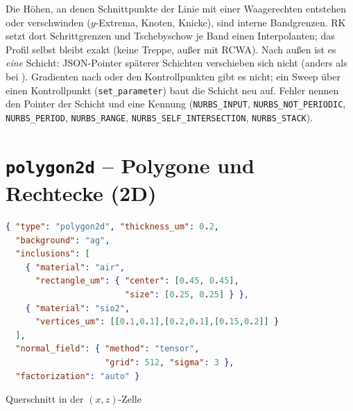 \begin{hinweis}
Die Höhen, an denen Schnittpunkte der Linie mit einer Waagerechten entstehen oder verschwinden ($y$-Extrema, Knoten,
Knicke), sind interne Bandgrenzen. RK setzt dort Schrittgrenzen und Tschebyschow je Band einen Interpolanten; das
Profil selbst bleibt exakt (keine Treppe, außer mit RCWA). Nach außen ist es \emph{eine} Schicht: JSON-Pointer
späterer Schichten verschieben sich nicht (anders als bei ). Gradienten nach  oder den
Kontrollpunkten gibt es nicht; ein Sweep über einen Kontrollpunkt (\texttt{set\_parameter}) baut die Schicht neu auf.
Fehler nennen den Pointer der Schicht und eine Kennung (\texttt{NURBS\_INPUT}, \texttt{NURBS\_NOT\_PERIODIC},
\texttt{NURBS\_PERIOD}, \texttt{NURBS\_RANGE}, \texttt{NURBS\_SELF\_INTERSECTION}, \texttt{NURBS\_STACK}).
\end{hinweis}

\section{\texttt{polygon2d} -- Polygone und Rechtecke (2D)}\label{sec:polygon2d}
%
\begin{minipage}{0.58\linewidth}
\begin{lstlisting}[language=json]
{ "type": "polygon2d", "thickness_um": 0.2,
  "background": "ag",
  "inclusions": [
    { "material": "air",
      "rectangle_um": { "center": [0.45, 0.45],
                        "size": [0.25, 0.25] } },
    { "material": "sio2",
      "vertices_um": [[0.1,0.1],[0.2,0.1],[0.15,0.2]] }
  ],
  "normal_field": { "method": "tensor",
                    "grid": 512, "sigma": 3 },
  "factorization": "auto" }
\end{lstlisting}
\end{minipage}\hfill
\begin{minipage}{0.38\linewidth}
\centering
{}

\small Querschnitt in der $(x,z)$-Zelle
\end{minipage}


